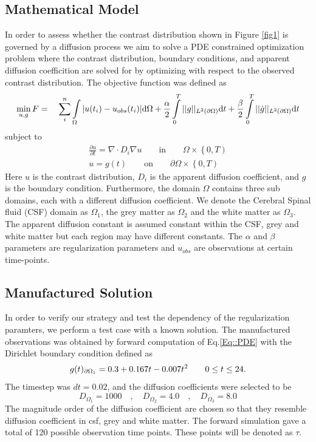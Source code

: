 \documentclass[11pt,a4paper]{article}
\begin{document}
\subsection*{Mathematical Model}
In order to assess whether the contrast distribution shown 
in Figure \ref{fig1} is governed by a diffusion process we
aim to solve a PDE constrained optimization problem where
the contrast distribution, boundary conditions, and apparent
diffusion coefficition are solved for by optimizing with
respect to the observed contrast distribution.  
The objective function was defined as 
\begin{equation}
\min_{u,g} F = \quad \sum\limits_i\sp{n} \int\limits_{\Omega} |u(t_i) - u_{obs}(t_i)| \mathrm{d}\Omega + \frac{\alpha}{2} \int\limits_{0}\sp{T} || g ||_{L\sp{2}(\partial\Omega)} \mathrm{d}t + \frac{\beta}{2} \int\limits_{0}\sp{T} || \dot{g} ||_{L\sp{2}(\partial\Omega)}\mathrm{d}t 
\label{EQ::objf}
\end{equation}
subject to 
\begin{equation}
\begin{aligned}
\frac{\partial u}{\partial t} = \nabla \cdot  D_i \nabla u \qquad \text{in} \qquad \Omega \times \left\lbrace 0 , T \right)  \\
u=g(t) \qquad \text{on} \qquad \partial\Omega  \times \left\lbrace 0 , T \right) 
\end{aligned}
\label{Eq::PDE}
\end{equation}
Here $u$ is the contrast distribution, $D_i$ is the apparent diffusion 
coefficient, and $g$ is the boundary condition. Furthermore,  
the domain $\Omega$ contains three sub domains, each with a different diffusion coefficient. We denote the Cerebral Spinal fluid (CSF) domain as $\Omega_1$, the grey matter as $\Omega_2$ and the white matter as $\Omega_3$. The apparent
diffusion constant is assumed constant within the CSF, grey and 
white matter but each region may have different constants.  
The $\alpha$ and $\beta$ parameters are regularization parameters 
and $u_{obs}$ are observations at certain time-points. 

\subsection*{Manufactured Solution}
In order to verify our strategy and test the dependency of the
regularization paramters, we perform a test case with a
known solution.  
The manufactured observations was obtained by forward computation of Eq.\ref{Eq::PDE} with the Dirichlet boundary condition defined as
\begin{equation}
g(t)_{\partial \Omega_1} = 0.3 +0.167t - 0.007t\sp{2} \qquad  0 \leq t \leq 24.
\end{equation}
The timestep was $dt = 0.02$, and the diffusion coefficients were selected to be 
\begin{equation}
D_{\Omega_1} = 1000 \quad , \quad D_{\Omega_2} = 4.0 \quad , \quad D_{\Omega_3} = 8.0 
\end{equation}  
The magnitude order of the diffusion coefficient are chosen so that they resemble diffusion coefficient in csf, grey and white matter. The forward simulation gave a total of 120 possible observation time points. These points 
will be denoted as $\tau$.
\end{document}
